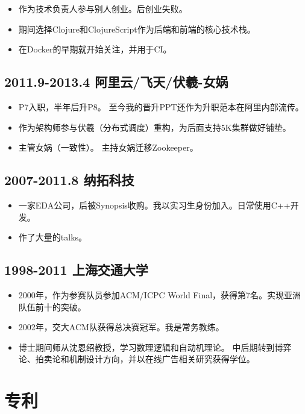 \documentclass[scheme=plain]{ctexart}
\begin{document}
\begin{itemize}
    \item 作为技术负责人参与别人创业。后创业失败。
    \item 期间选择Clojure和ClojureScript作为后端和前端的核心技术栈。
    \item 在Docker的早期就开始关注，并用于CI。
\end{itemize}

\subsection*{2011.9-2013.4 阿里云/飞天/伏羲-女娲}

\begin{itemize}
    \item P7入职，半年后升P8。
        至今我的晋升PPT还作为升职范本在阿里内部流传。
    \item 作为架构师参与伏羲（分布式调度）重构，为后面支持5K集群做好铺垫。
    \item 主管女娲（一致性）。
        主持女娲迁移Zookeeper。
\end{itemize}

\subsection*{2007-2011.8 纳拓科技}

\begin{itemize}
    \item 一家EDA公司，后被Synopsis收购。我以实习生身份加入。日常使用C++开发。
    \item 作了大量的talks。
\end{itemize}

\subsection*{1998-2011 上海交通大学}

\begin{itemize}
    \item 2000年，作为参赛队员参加ACM/ICPC World Final，获得第7名。实现亚洲队伍前十的突破。
    \item 2002年，交大ACM队获得总决赛冠军。我是常务教练。
    \item 博士期间师从沈恩绍教授，学习数理逻辑和自动机理论。
        中后期转到博弈论、拍卖论和机制设计方向，并以在线广告相关研究获得学位。
\end{itemize}

\appendix
\clearpage
\section{专利}
\end{document}
